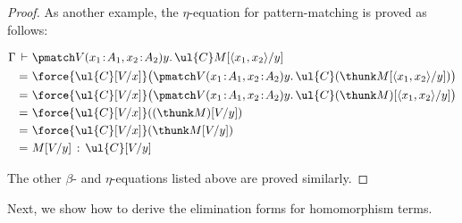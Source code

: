 \begin{proof}
\vspace{0.3cm}

As another example, the $\eta$-equation for pattern-matching is proved as follows:
\begin{fleqn}[0.3cm]
\begin{align*}
\Gamma \,\vdash\,\, & \pmatch V {(x_1 \!:\! A_1, x_2 \!:\! A_2)} {y.\,\ul{C}} {M[{\langle x_1 , x_2 \rangle}/y]}
\\
=\,\, & \force {\ul{C}[V/x]} \big(\pmatch V {(x_1 \!:\! A_1, x_2 \!:\! A_2)} {y.\, \ul{C}} {(\thunk M[{\langle x_1 , x_2 \rangle}/y])}\big)
\\
=\,\, & \force {\ul{C}[V/x]} \big(\pmatch V {(x_1 \!:\! A_1, x_2 \!:\! A_2)} {y.\, \ul{C}} {(\thunk M)[{\langle x_1 , x_2 \rangle}/y]}\big)
\\
=\,\, & \force {\ul{C}[V/x]} ((\thunk M)[V/y])
\\
=\,\, & \force {\ul{C}[V/x]} (\thunk M[V/y])
\\
=\,\, & M[V/y] \,:\, \ul{C}[V/y]
\end{align*}
\end{fleqn}
The other $\beta$- and $\eta$-equations listed above are proved similarly.
\end{proof}

Next, we show how to derive the elimination forms for homomorphism terms.


\pagebreak

